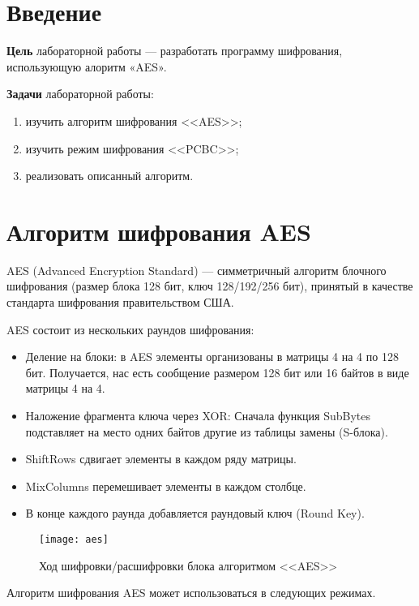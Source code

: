 \documentclass[14pt, oneside, a4paper]{extreport}
\begin{document}

\setcounter{page}{2}

\section*{Введение}

\textbf{Цель} лабораторной работы --- разработать программу шифрования, использующую алоритм «AES».

\textbf{Задачи} лабораторной работы:
\begin{enumerate}
	\item изучить алгоритм шифрования <<AES>>;
	\item изучить режим шифрования <<PCBC>>;
	\item реализовать описанный алгоритм.
\end{enumerate}

\section*{Алгоритм шифрования AES}

AES (Advanced Encryption Standard) --- симметричный алгоритм блочного шифрования (размер блока 128 бит, ключ 128/192/256 бит), принятый в качестве стандарта шифрования правительством США.

AES состоит из нескольких раундов шифрования:
\begin{itemize}
	 \item Деление на блоки: в AES элементы организованы в матрицы 4 на 4 по
	128 бит. Получается, нас есть сообщение размером 128 бит или 16 байтов
	в виде матрицы 4 на 4.
	\item Наложение фрагмента ключа через XOR: Сначала функция SubBytes
	подставляет на место одних байтов другие из таблицы замены (S-блока).	
	\item ShiftRows сдвигает элементы в каждом ряду матрицы.	
	\item MixColumns перемешивает элементы в каждом столбце. 
	\item В конце каждого раунда добавляется раундовый ключ (Round Key).
\end{itemize}

\begin{figure}[!ht]
   \texttt{[image: aes]}
   \caption{Ход шифровки/расшифровки блока алгоритмом <<AES>>}
   \label{fig:aes}
\end{figure}
\clearpage

Алгоритм шифрования AES может использоваться в следующих режимах.
\end{document}
